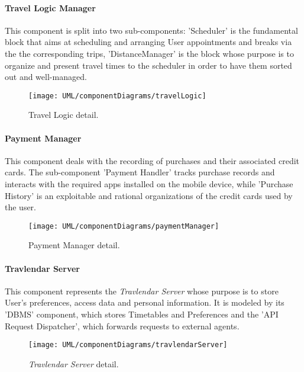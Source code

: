 	\paragraph{Travel Logic Manager}
		This component is split into two sub-components: 'Scheduler' is the fundamental block that aims at scheduling and arranging User appointments and breaks via the the corresponding trips, 'DistanceManager' is the block whose purpose is to organize and present travel times to the scheduler in order to have them sorted out and well-managed.

		\begin{figure}[H]
			\centering
			\texttt{[image: UML/componentDiagrams/travelLogic]}
			\caption{Travel Logic detail.}
			\label{travelLogicDetail}
		\end{figure}
	

	\paragraph{Payment Manager}
		This component deals with the recording of purchases and their associated credit cards.
		The sub-component 'Payment Handler' tracks purchase records and interacts with the required apps installed on the mobile device, while 'Purchase History' is an exploitable and rational organizations of the credit cards used by the user.

		\begin{figure}[H]
			\centering
			\texttt{[image: UML/componentDiagrams/paymentManager]}
			\caption{Payment Manager detail.}
			\label{paymentManagerDetail}
		\end{figure}
		
		
	\paragraph{Travlendar Server} 
		This component represents the \textit{Travlendar Server} whose purpose is to store User's preferences, access data and personal information. It is modeled by its 'DBMS' component, which stores Timetables and Preferences and the 'API Request Dispatcher', which forwards requests to external agents.

		\begin{figure}[H]
			\centering
			\texttt{[image: UML/componentDiagrams/travlendarServer]}
			\caption{\textit{Travlendar Server} detail.}
			\label{serverDetail}
		\end{figure}


